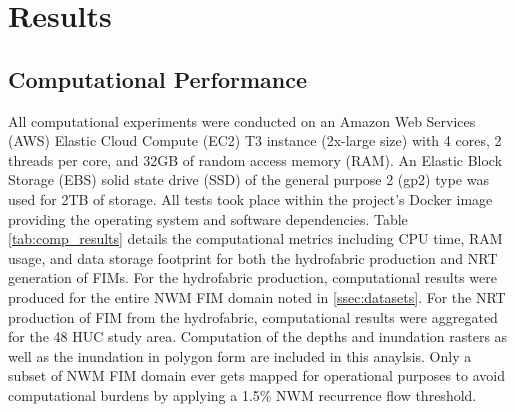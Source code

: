 \section{Results}
\label{sec:results}

\subsection{Computational Performance}
\label{ssec:compuational_performance}
%
All computational experiments were conducted on an Amazon Web Services (AWS) Elastic Cloud Compute (EC2) T3 instance (2x-large size) with 4 cores, 2 threads per core, and 32GB of random access memory (RAM).
An Elastic Block Storage (EBS) solid state drive (SSD) of the general purpose 2 (gp2) type was used for 2TB of storage.
All tests took place within the project's Docker image providing the operating system and software dependencies.
Table \ref{tab:comp_results} details the computational metrics including CPU time, RAM usage, and data storage footprint for both the hydrofabric production and NRT generation of FIMs.
For the hydrofabric production, computational results were produced for the entire NWM FIM domain noted in \ref{ssec:datasets}.
For the NRT production of FIM from the hydrofabric, computational results were aggregated for the 48 HUC study area.
Computation of the depths and inundation rasters as well as the inundation in polygon form are included in this anaylsis.
Only a subset of NWM FIM domain ever gets mapped for operational purposes to avoid computational burdens by applying a 1.5\% NWM recurrence flow threshold.


